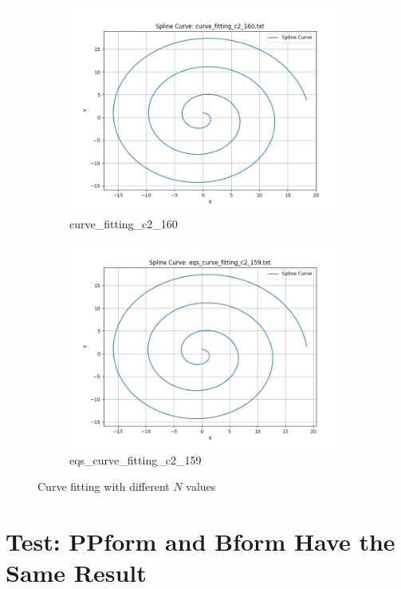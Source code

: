 \documentclass[a4paper]{article}
\begin{document}
\begin{figure}[htbp]
\begin{subfigure}[t]{0.24\textwidth}
      \includegraphics[width=\textwidth]{figures/E/curve_fitting_c2_160.png}
      \caption*{curve\_fitting\_c2\_160}
  \end{subfigure}
  \begin{subfigure}[t]{0.24\textwidth}
      \centering
      \includegraphics[width=\textwidth]{figures/E/eqs_curve_fitting_c2_159.png}
      \caption*{eqs\_curve\_fitting\_c2\_159}
  \end{subfigure}
  \caption{Curve fitting with different $N$ values}
  \label{fig:curve_fitting}
\end{figure}

\newpage
\section*{Test: PPform and Bform Have the Same Result}
\end{document}
